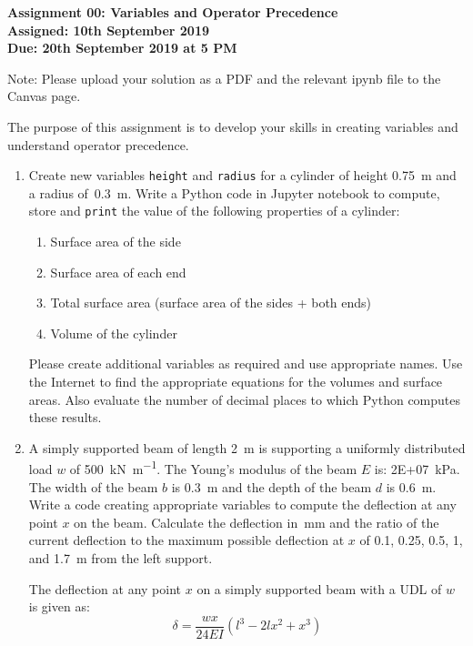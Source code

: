 \documentclass[a4paper,12pt]{article}
\begin{document}
\begin{centering}
	\textbf{
		Assignment 00: Variables and Operator Precedence\\
		Assigned: 10th September 2019\\
		Due: 20th September 2019 at 5 PM\\
	}
\end{centering}


Note: Please upload your solution as a PDF and the relevant ipynb file to the Canvas page.

\vspace{1em}
 
 The purpose of this assignment is to develop your skills in creating variables and understand operator precedence.
 
\begin{enumerate}
	\item Create new variables \verb|height| and \verb|radius| for a cylinder of height \SI{0.75}{\meter} and a radius of~\SI{0.3}{\meter}. Write a Python code in Jupyter notebook to compute, store and \verb|print| the value of the following properties of a cylinder:
	\begin{enumerate}
		\item Surface area of the side
		\item Surface area of each end
		\item Total surface area (surface area of the sides + both ends)
		\item Volume of the cylinder
	\end{enumerate}
	Please create additional variables as required and use appropriate names. Use the Internet to find the appropriate equations for the volumes and surface areas. Also evaluate the number of decimal places to which Python computes these results.
	
	\item A simply supported beam of length \SI{2}{\meter} is supporting a uniformly distributed load $w$ of \SI{500}{\kilo \newton \per \meter}. The Young's modulus of the beam $E$ is: \SI{2E+07}{\kilo\pascal}. The width of the beam $b$ is \SI{0.3}{\meter} and the depth of the beam $d$ is \SI{0.6}{\meter}. Write a code creating appropriate variables to compute the deflection at any point $x$ on the beam. Calculate the deflection in~\si{\milli\meter} and the ratio of the current deflection to the maximum possible deflection at $x$ of 0.1, 0.25, 0.5, 1, and 1.7~\si{\meter} from the left support.
	
	The deflection at any point $x$ on a simply supported beam with a UDL of $w$ is given as:
	\begin{equation*}
		\delta = \frac{w x}{24 EI}(l^3 - 2lx^2 + x^3)
	\end{equation*}
	

\end{enumerate}
\end{document}
